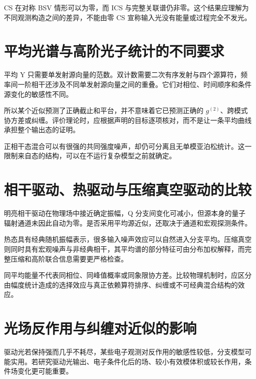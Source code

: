 \documentclass[UTF8,a4paper,zihao=-4,openany,fontset=fandol]{ctexbook}
\begin{document}
CS 在对称 BSV 情形可以为零，而 ICS 与完整关联谱仍非零。这个结果应理解为不同观测构造之间的差异，不能由零 CS 宣称输入光没有能量或过程完全不发光。



\section{平均光谱与高阶光子统计的不同要求}\label{sec:14:6}


平均 Y 只需要单发射源向量的范数。双计数需要二次有序发射与四个源算符，频率间一阶相干还涉及不同单发射源向量之间的重叠。它们对相位、时间顺序和条件源变化的敏感性不同。



所以某个近似预测了正确截止和平台，并不意味着它已预测正确的 $g^{(2)}$、跨模式协方差或纠缠。评价理论时，应根据声明的目标逐项核对，而不是让一条平均曲线承担整个输出态的证明。



正相干态混合可以有很强的共同强度噪声，却仍可分离且无单模亚泊松统计。这一限制来自态的结构，可以在不运行复杂模型之前就确定。



\section{相干驱动、热驱动与压缩真空驱动的比较}\label{sec:14:7}


明亮相干驱动在物理场中接近确定振幅，Q 分支间变化可减小，但源本身的量子辐射通道未因此自动为零。是否采用平均源近似，还取决于通道和宏观探测条件。



热态具有经典随机振幅表示，很多输入噪声效应可以自然进入分支平均。压缩真空则同时具有宏观噪声与非经典相干，其平均谱的部分特征可由分布加权解释，而完整压缩和高阶联合信息需要更严格检查。



同平均能量不代表同相位、同峰值概率或同象限协方差。比较物理机制时，应区分由幅度统计造成的选择效应与真正依赖算符排序、纠缠或不可经典混合结构的效应。



\section{光场反作用与纠缠对近似的影响}\label{sec:14:8}


驱动光若保持强而几乎不耗尽，某些电子观测对反作用的敏感性较低，分支模型可能实用。若研究驱动光输出、电子条件化后的场、较小有效模体积或较长作用，条件场变化更可能重要。
\end{document}
